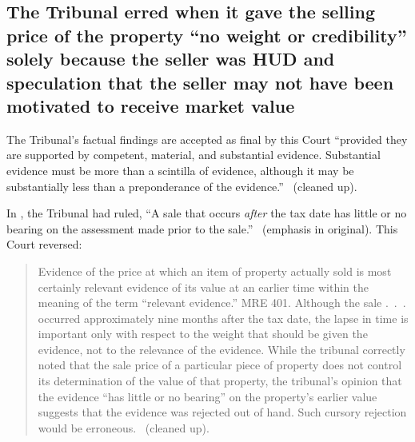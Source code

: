 \documentclass[12pt,\documentclassflag]{michiganCourtOfAppealsBrief}
\begin{document}




\subsection{The Tribunal erred when it gave the selling price of the property ``no weight or credibility'' solely because the seller was HUD and speculation that the seller may not have been motivated to receive market value}

The Tribunal's factual findings are accepted as final by this Court ``provided they are supported by competent, material, and substantial evidence. Substantial evidence must be more than a scintilla of evidence, although it may be substantially less than a preponderance of the evidence.'' \ (cleaned up).

In \cite[s]{Jones & Laughlin}, the Tribunal had ruled, ``A sale that occurs {\em after} the tax date has little or no bearing on the assessment made prior to the sale.'' \ (emphasis in original). This Court reversed:

\begin{quote}
Evidence of the price at which an item of property actually sold is most certainly relevant evidence of its value at an earlier time within the meaning of the term ``relevant evidence.'' MRE 401. Although the sale .~.~. occurred approximately nine months after the tax date, the lapse in time is important only with respect to the weight that should be given the evidence, not to the relevance of the evidence. While the tribunal correctly noted that the sale price of a particular piece of property does not control its determination of the value of that property, the tribunal's opinion that the evidence ``has little or no bearing'' on the property's earlier value suggests that the evidence was rejected out of hand. Such cursory rejection would be erroneous. \ (cleaned up).
\end{quote} 
\end{document}
